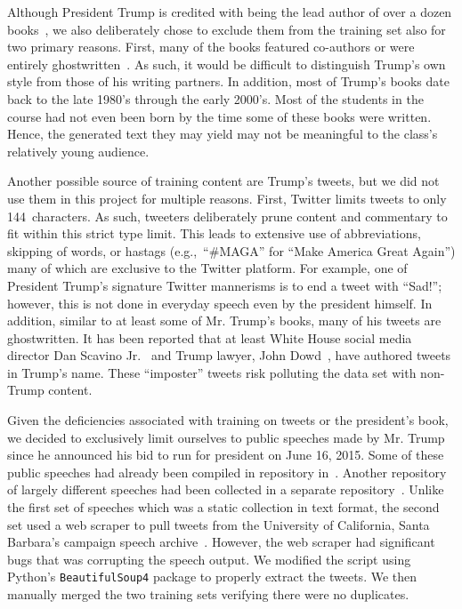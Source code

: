\documentclass{article}
\begin{document}
Although President Trump is credited with being the lead author of over a dozen books~\cite{trumpArtOfTheDeal,trumpSurvivingAtTheTop,trumpArtOfTheComeback,trumpTheAmericaWeDeserve,trumpHowToGetRich,trumpCrippledAmerica,trumpTimeToGetTough,trumpThinkBig,trump101,trumpNeverGiveUp,trumpWhyWeWantYou,trumpBestGolfAdvice,trumpMidasTouch}, we also deliberately chose to exclude them from the training set also for two primary reasons.  First, many of the books featured co-authors or were entirely ghostwritten~\cite{mayerNewYorkerGhostwriter}.  As such, it would be difficult to distinguish Trump's own style from those of his writing partners.  In addition, most of Trump's books date back to the late 1980's through the early 2000's.  Most of the students in the course had not even been born by the time some of these books were written. Hence, the generated text they may yield may not be meaningful to the class's relatively young audience.

Another possible source of training content are Trump's tweets, but we did not use them in this project for multiple reasons.  First, Twitter limits tweets to only 144~characters. As such, tweeters deliberately prune content and commentary to fit within this strict type limit.  This leads to extensive use of abbreviations, skipping of words, or hastags (e.g.,~``\#MAGA'' for ``Make America Great Again'') many of which are exclusive to the Twitter platform. For example, one of President Trump's signature Twitter mannerisms is to end a tweet with ``Sad!''; however, this is not done in everyday speech even by the president himself. In addition, similar to at least some of Mr. Trump's books, many of his tweets are ghostwritten.  It has been reported that at least White House social media director Dan Scavino Jr.~\cite{ohlheiser2017} and Trump lawyer, John Dowd~\cite{phillipsBlake2017}, have authored tweets in Trump's name.  These ``imposter'' tweets risk polluting the data set with non-Trump content.

Given the deficiencies associated with training on tweets or the president's book, we decided to exclusively limit ourselves to public speeches made by Mr. Trump since he announced his bid to run for president on June 16, 2015.  Some of these public speeches had already been compiled in repository in~\cite{ryanMcdermottTrumpSpeeches}.  Another repository of largely different speeches had been collected in a separate repository~\cite{pedramNavidTrumpSpeeches}.  Unlike the first set of speeches which was a static collection in text format, the second set used a web scraper to pull tweets from the University of California, Santa Barbara's campaign speech archive~\cite{americanPresidencyProject}.  However, the web scraper had significant bugs that was corrupting the speech output.  We modified the script using Python's \texttt{BeautifulSoup4} package to properly extract the tweets.  We then manually merged the two training sets verifying there were no duplicates.
\end{document}
